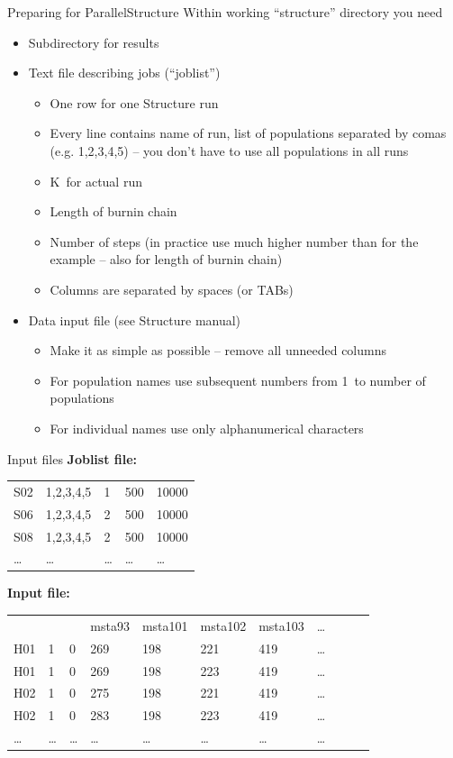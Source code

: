 \documentclass[compress, ucs, xelatex, 11pt, xcolor=svgnames,
  hyperref={
    bookmarks=true,
    unicode=true,
    colorlinks=true,
    pdftitle={Molecular data in R},
    plainpages=false,
    pdfauthor={Vojtech Zeisek},
    pdfsubject={Course about phylogeny and evolution in R},
    pdfcreator={XeLaTeX},
    pdfkeywords={R, evolution, phylogeny, molecular data},
    linkcolor=Tomato,
    anchorcolor=SaddleBrown,
    citecolor=Goldenrod,
    filecolor=DarkMagenta,
    menucolor=Sienna,
    urlcolor=DarkTurquoise,
    pdftex},
  url={hyphens, lowtilde} %
  ]{beamer}
\begin{document}
\begin{frame}{Preparing for ParallelStructure}
  Within working ``structure'' directory you need
  \begin{itemize}
    \item Subdirectory for results
    \item Text file describing jobs (``joblist'')
      \begin{itemize}
	\item One row for one Structure run
	\item Every line contains name of run, list of populations separated by comas (e.g. 1,2,3,4,5) -- you don't have to use all populations in all runs
	\item K~for actual run
	\item Length of burnin chain
	\item Number of steps (in practice use much higher number than for the example -- also for length of burnin chain)
	\item Columns are separated by spaces (or TABs)
      \end{itemize}
    \item Data input file (see Structure manual)
      \begin{itemize}
	\item Make it as simple as possible -- remove all unneeded columns
	\item For population names use subsequent numbers from 1~to number of populations
	\item For individual names use only alphanumerical characters
    \end{itemize}
  \end{itemize}
\end{frame}

\begin{frame}[fragile]{Input files}
  \vfil
  \textbf{Joblist file:}
  \vfil
  \begin{tabular}{lllll}
    S02 & 1,2,3,4,5 & 1 & 500 & 10000\\
    S06 & 1,2,3,4,5 & 2 & 500 & 10000\\
    S08 & 1,2,3,4,5 & 2 & 500 & 10000\\
    \ldots & \ldots & \ldots & \ldots & \ldots
  \end{tabular}
  \vfill
  \textbf{Input file:}
  \vfil
  \begin{tabular}{lllllllllll}
    & & & msta93 & msta101 & msta102 & msta103 & \ldots\\
    H01 & 1 & 0 & 269 & 198 & 221 & 419 & \ldots\\
    H01 & 1 & 0 & 269 & 198 & 223 & 419 & \ldots\\
    H02 & 1 & 0 & 275 & 198 & 221 & 419 & \ldots\\
    H02 & 1 & 0 & 283 & 198 & 223 & 419 & \ldots\\
    \ldots & \ldots & \ldots & \ldots & \ldots & \ldots & \ldots & \ldots
  \end{tabular}
  \vfil
\end{frame}
\end{document}
